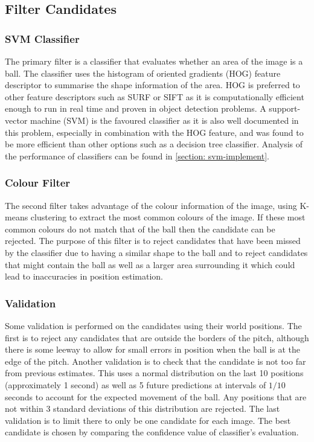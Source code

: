 \subsection{Filter Candidates}

\subsubsection{SVM Classifier}
\label{section: svm-hog}

The primary filter is a classifier that evaluates whether an area of the image is a ball. The classifier uses the histogram of oriented gradients (HOG) feature descriptor to summarise the shape information of the area. HOG is preferred to other feature descriptors such as SURF or SIFT as it is computationally efficient enough to run in real time and proven in object detection problems. A support-vector machine (SVM) is the favoured classifier as it is also well documented in this problem, especially in combination with the HOG feature, and was found to be more efficient than other options such as a decision tree classifier. Analysis of the performance of classifiers can be found in \ref{section: svm-implement}.

\subsubsection{Colour Filter}
\label{section: colour filter design}

The second filter takes advantage of the colour information of the image, using K-means clustering to extract the most common colours of the image. If these most common colours do not match that of the ball then the candidate can be rejected. The purpose of this filter is to reject candidates that have been missed by the classifier due to having a similar shape to the ball and to reject candidates that might contain the ball as well as a larger area surrounding it which could lead to inaccuracies in position estimation.

\subsubsection{Validation}

Some validation is performed on the candidates using their world positions. The first is to reject any candidates that are outside the borders of the pitch, although there is some leeway to allow for small errors in position when the ball is at the edge of the pitch. Another validation is to check that the candidate is not too far from previous estimates. This uses a normal distribution on the last 10 positions (approximately 1 second) as well as 5 future predictions at intervals of $1/10$ seconds to account for the expected movement of the ball. Any positions that are not within 3 standard deviations of this distribution are rejected. The last validation is to limit there to only be one candidate for each image. The best candidate is chosen by comparing the confidence value of classifier's evaluation.
 
